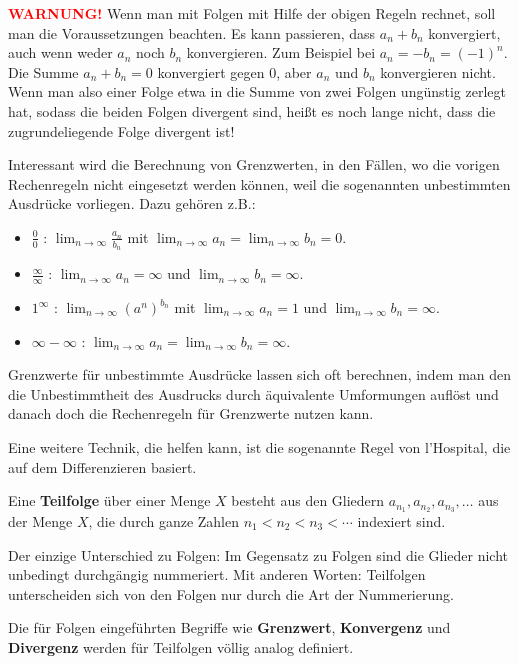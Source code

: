 \begin{bem}
	\textcolor{red}{\textbf{WARNUNG!}}
	Wenn man mit Folgen mit Hilfe der obigen Regeln rechnet, soll man die Voraussetzungen beachten. Es kann passieren, dass $a_n + b_n$ konvergiert, auch wenn weder $a_n$ noch $b_n$ konvergieren. Zum Beispiel bei $a_n = - b_n = (-1)^n$. Die Summe $a_n + b_n = 0$ konvergiert gegen $0$, aber $a_n$ und $b_n$ konvergieren nicht. Wenn man also einer Folge etwa in die Summe von zwei Folgen ungünstig zerlegt hat, sodass die beiden Folgen divergent sind, heißt es noch lange nicht, dass die zugrundeliegende Folge divergent ist!
\end{bem} 

\begin{bem} 
	Interessant wird die Berechnung von Grenzwerten, in den Fällen, wo die vorigen Rechenregeln nicht eingesetzt werden können, weil die sogenannten unbestimmten Ausdrücke vorliegen. Dazu gehören z.B.: 
	\begin{itemize} 
			\item[] {\color{red} \glqq $\frac{0}{0}$ \grqq:}  $\lim_{n \to \infty} \frac{a_n}{b_n}$ mit $\lim_{n \to \infty} a_n = \lim_{n \to \infty} b_n= 0$. 
			\item[] {\color{red} \glqq$\frac{\infty}{\infty}$ \grqq:}  $\lim_{n \to \infty} a_n  = \infty $ und $\lim_{n \to \infty} b_n  = \infty$. 
			\item[] {\color{red} \glqq$1^\infty$ \grqq: } $\lim_{n \to \infty} (a^n )^{b_n}$ mit $\lim_{n \to \infty} a _n = 1$ und $\lim_{n \to \infty} b_n = \infty$. 
			\item[]  {\color{red} \glqq$\infty - \infty$ \grqq: } $\lim_{n \to \infty} a_n = \lim_{n \to \infty} b_n = \infty$. 
	\end{itemize} 
	Grenzwerte für unbestimmte Ausdrücke lassen sich oft berechnen, indem man den die Unbestimmtheit des Ausdrucks durch äquivalente Umformungen auflöst und danach doch die Rechenregeln für Grenzwerte nutzen kann. 
	
	Eine weitere Technik, die helfen kann, ist die sogenannte Regel von l'Hospital, die auf dem Differenzieren basiert. 
\end{bem} 



\begin{defn} 
	Eine \textbf{Teilfolge} über einer Menge $X$ besteht aus den Gliedern $a_{n_1} , a_{n_2}, a_{n_3},\ldots$ aus der Menge $X$, die durch ganze Zahlen $n_1 < n_2 < n_3 <  \cdots$ indexiert sind. 
	
	Der einzige Unterschied zu Folgen: Im Gegensatz zu Folgen sind die Glieder nicht unbedingt durchgängig nummeriert. Mit anderen Worten: Teilfolgen unterscheiden sich von den Folgen nur durch die Art der Nummerierung. 
	
	Die für Folgen eingeführten Begriffe wie \textbf{Grenzwert}, \textbf{Konvergenz} und \textbf{Divergenz} werden für Teilfolgen völlig analog definiert. 
\end{defn} 

